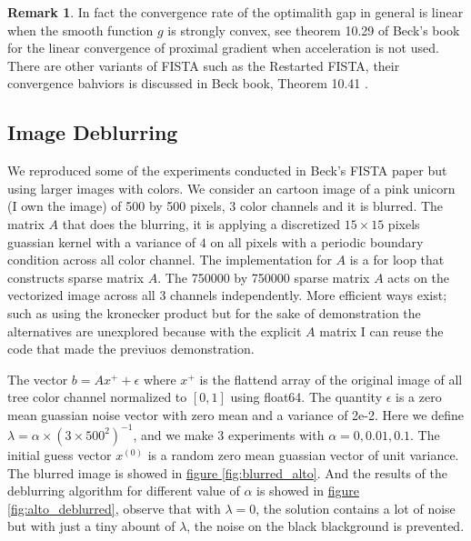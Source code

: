 \documentclass[]{article}
\theoremstyle{definition}
\newtheorem{remark}{Remark}[subsection]
{
    \newtheorem{assumption}{Assumption}
}
\begin{document}
        \begin{remark}
            In fact the convergence rate of the optimalith gap in general is linear when the smooth function $g$ is strongly convex, see theorem 10.29 of Beck's book\cite{book:first_order_opt} for the linear convergence of proximal gradient when acceleration is not used. There are other variants of FISTA such as the Restarted FISTA, their convergence bahviors is discussed in Beck book, Theorem 10.41 \cite{book:first_order_opt}.     
        \end{remark}
        
    \subsection*{Image Deblurring}
        We reproduced some of the experiments conducted in Beck's FISTA paper \cite{paper:FISTA} but using larger images with colors. We consider an cartoon image of a pink unicorn (I own the image) of 500 by 500 pixels, 3 color channels and it is blurred. The matrix $A$ that does the blurring, it is applying a discretized $15\times 15$ pixels guassian kernel with a variance of $4$ on all pixels with a periodic boundary condition across all color channel. The implementation for $A$ is a for loop that constructs sparse matrix $A$. The 750000 by 750000 sparse matrix $A$ acts on the vectorized image across all 3 channels independently. More efficient ways exist; such as using the kronecker product but for the sake of demonstration the alternatives are unexplored because with the explicit $A$ matrix I can reuse the code that made the previuos demonstration. 
        \par
        The vector $b = Ax^+ + \epsilon$ where $x^+$ is the flattend array of the original image of all tree color channel normalized to $[0, 1]$ using float64. The quantity $\epsilon$ is a zero mean guassian noise vector with zero mean and a variance of 2e-2. Here we define $\lambda = \alpha\times (3\times500^2)^{-1}$, and we make 3 experiments with $\alpha = 0, 0.01, 0.1$. The initial guess vector $x^{(0)}$ is a random zero mean guassian vector of unit variance. The blurred image is showed in \hyperref[fig:blurred_alto]{figure \ref*{fig:blurred_alto}}. And the results of the deblurring algorithm for different value of $\alpha$ is showed in \hyperref[fig:alto_deblurred]{figure \ref*{fig:alto_deblurred}}, observe that with $\lambda = 0$, the solution contains a lot of noise but with just a tiny abount of $\lambda$, the noise on the black blackground is prevented. 
\end{document}
